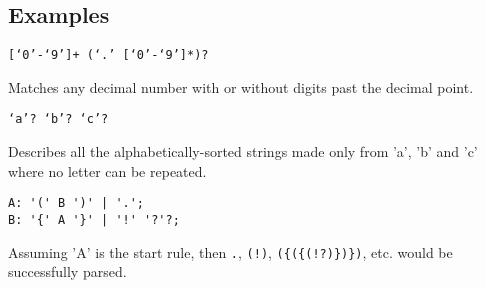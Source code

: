 
\subsection{Examples}
{
	\begin{itemize}
	{
		\item \texttt{[`0'-`9']+ (`.' [`0'-`9']*)?}
		
			Matches any decimal number with or without digits
			past the decimal point.
		
		\item \texttt{`a'? `b'? `c'?}
		
			Describes all the alphabetically-sorted strings made only
			from 'a', 'b' and 'c' where no letter can be repeated.
		
		\item
\begin{lstlisting}
A: '(' B ')' | '.';
B: '{' A '}' | '!' '?'?;
\end{lstlisting}
			Assuming 'A' is the start rule, then \texttt{.},
			\texttt{(!)}, \texttt{(\{(\{(!?)\})\})}, etc.
			would be successfully parsed.
	}
	\end{itemize}
}

